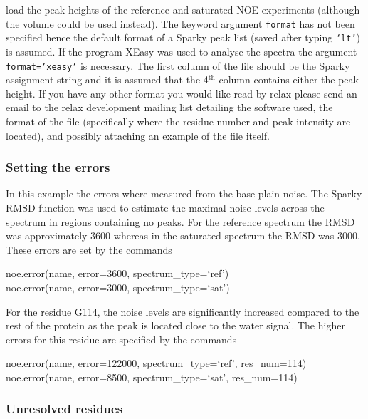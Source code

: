 load the peak heights of the reference and saturated NOE experiments (although the volume could be used instead).  The keyword argument \texttt{format} has not been specified hence the default format of a Sparky peak list (saved after typing \texttt{`lt'}) is assumed.  If the program XEasy was used to analyse the spectra the argument \texttt{format='xeasy'} is necessary.  The first column of the file should be the Sparky assignment string and it is assumed that the 4$^\textrm{th}$ column contains either the peak height.  If you have any other format you would like read by relax please send an email to the relax development mailing list detailing the software used, the format of the file (specifically where the residue number and peak intensity are located), and possibly attaching an example of the file itself.


\subsubsection{Setting the errors}

In this example the errors where measured from the base plain noise.  The Sparky RMSD function was used to estimate the maximal noise levels across the spectrum in regions containing no peaks.  For the reference spectrum the RMSD was approximately 3600 whereas in the saturated spectrum the RMSD was 3000.  These errors are set by the commands

\begin{exampleenv}
noe.error(name, error=3600, spectrum\_type=`ref') \\
noe.error(name, error=3000, spectrum\_type=`sat')
\end{exampleenv}

For the residue G114, the noise levels are significantly increased compared to the rest of the protein as the peak is located close to the water signal.  The higher errors for this residue are specified by the commands

\begin{exampleenv}
noe.error(name, error=122000, spectrum\_type=`ref', res\_num=114) \\
noe.error(name, error=8500, spectrum\_type=`sat', res\_num=114)
\end{exampleenv}


\subsubsection{Unresolved residues}

